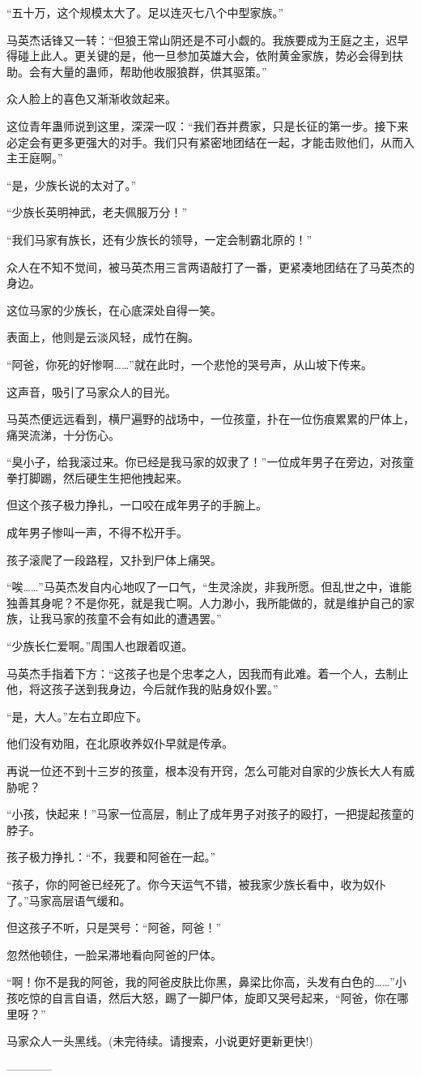 \begin{this_body}
“五十万，这个规模太大了。足以连灭七八个中型家族。”

马英杰话锋又一转：“但狼王常山阴还是不可小觑的。我族要成为王庭之主，迟早得碰上此人。更关键的是，他一旦参加英雄大会，依附黄金家族，势必会得到扶助。会有大量的蛊师，帮助他收服狼群，供其驱策。”

众人脸上的喜色又渐渐收敛起来。

这位青年蛊师说到这里，深深一叹：“我们吞并费家，只是长征的第一步。接下来必定会有更多更强大的对手。我们只有紧密地团结在一起，才能击败他们，从而入主王庭啊。”

“是，少族长说的太对了。”

“少族长英明神武，老夫佩服万分！”

“我们马家有族长，还有少族长的领导，一定会制霸北原的！”

众人在不知不觉间，被马英杰用三言两语敲打了一番，更紧凑地团结在了马英杰的身边。

这位马家的少族长，在心底深处自得一笑。

表面上，他则是云淡风轻，成竹在胸。

“阿爸，你死的好惨啊……”就在此时，一个悲怆的哭号声，从山坡下传来。

这声音，吸引了马家众人的目光。

马英杰便远远看到，横尸遍野的战场中，一位孩童，扑在一位伤痕累累的尸体上，痛哭流涕，十分伤心。

“臭小子，给我滚过来。你已经是我马家的奴隶了！”一位成年男子在旁边，对孩童拳打脚踢，然后硬生生把他拽起来。

但这个孩子极力挣扎，一口咬在成年男子的手腕上。

成年男子惨叫一声，不得不松开手。

孩子滚爬了一段路程，又扑到尸体上痛哭。

“唉……”马英杰发自内心地叹了一口气，“生灵涂炭，非我所愿。但乱世之中，谁能独善其身呢？不是你死，就是我亡啊。人力渺小，我所能做的，就是维护自己的家族，让我马家的孩童不会有如此的遭遇罢。”

“少族长仁爱啊。”周围人也跟着叹道。

马英杰手指着下方：“这孩子也是个忠孝之人，因我而有此难。着一个人，去制止他，将这孩子送到我身边，今后就作我的贴身奴仆罢。”

“是，大人。”左右立即应下。

他们没有劝阻，在北原收养奴仆早就是传承。

再说一位还不到十三岁的孩童，根本没有开窍，怎么可能对自家的少族长大人有威胁呢？

“小孩，快起来！”马家一位高层，制止了成年男子对孩子的殴打，一把提起孩童的脖子。

孩子极力挣扎：“不，我要和阿爸在一起。”

“孩子，你的阿爸已经死了。你今天运气不错，被我家少族长看中，收为奴仆了。”马家高层语气缓和。

但这孩子不听，只是哭号：“阿爸，阿爸！”

忽然他顿住，一脸呆滞地看向阿爸的尸体。

“啊！你不是我的阿爸，我的阿爸皮肤比你黑，鼻梁比你高，头发有白色的……”小孩吃惊的自言自语，然后大怒，踢了一脚尸体，旋即又哭号起来，“阿爸，你在哪里呀？”

马家众人一头黑线。(未完待续。请搜索，小说更好更新更快!)

------------

\end{this_body}

